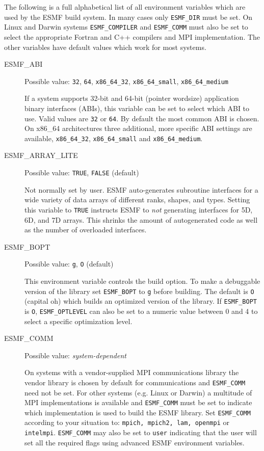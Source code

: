 The following is a full alphabetical list of all environment variables which
are used by the ESMF build system. In many cases only {\tt ESMF\_DIR} must be 
set. On Linux and Darwin systems {\tt ESMF\_COMPILER} and {\tt ESMF\_COMM} must
also be set to select the appropriate Fortran and C++ compilers and MPI 
implementation. The other variables have default values which work for
most systems.

\begin{description}

\item[ESMF\_ABI]
Possible value: {\tt 32}, {\tt 64}, {\tt x86\_64\_32}, {\tt x86\_64\_small}, {\tt x86\_64\_medium}

If a system supports 32-bit and 64-bit (pointer wordsize) application binary
interfaces (ABIs), this variable can be set to select which ABI to use. Valid 
values are {\tt 32} or {\tt 64}. By default the most common ABI is chosen. On
x86\_64 architectures three additional, more specific ABI settings are available,
{\tt x86\_64\_32}, {\tt x86\_64\_small} and {\tt x86\_64\_medium}.

\item[ESMF\_ARRAY\_LITE]
Possible value: {\tt TRUE}, {\tt FALSE} (default)

Not normally set by user. ESMF auto-generates subroutine interfaces for a wide
variety of data arrays of different ranks, shapes, and types. Setting this
variable to {\tt TRUE} instructs ESMF to {\em not} generating interfaces for
5D, 6D, and 7D arrays. This shrinks the amount of autogenerated code as well
as the number of overloaded interfaces.

\item[ESMF\_BOPT] 
Possible value: {\tt g}, {\tt O} (default)

This environment variable controls the build option. To make a debuggable
version of the library set {\tt ESMF\_BOPT} to {\tt g} before building. The 
default is {\tt O} (capital oh) which builds an optimized version of the
library. If {\tt ESMF\_BOPT} is {\tt O}, {\tt ESMF\_OPTLEVEL} can also be set
to a numeric value between 0 and 4 to select a specific optimization level.

\item[ESMF\_COMM]
Possible value: {\em system-dependent}

On systems with a vendor-supplied MPI communications library the vendor library 
is chosen by default for communications and {\tt ESMF\_COMM} need not be set.
For other systems (e.g. Linux or Darwin) a multitude of MPI implementations is
available and {\tt ESMF\_COMM} must be set to indicate which implementation is
used to build the ESMF library. Set {\tt ESMF\_COMM} according to your situation
to: {\tt mpich, mpich2, lam, openmpi} or {\tt intelmpi}. {\tt ESMF\_COMM} may
also be set to {\tt user} indicating that the user will set all the required
flags using advanced ESMF environment variables.


\end{description}
